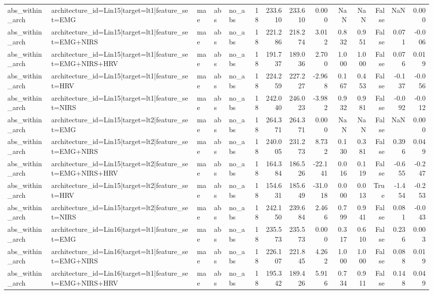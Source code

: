 \begin{table}
\begin{tabular}{lllllrrrrrrrrr}
abs_within_arch & architecture_id=Lin15|target=lt1|feature_set=EMG & mae & abs & no_abs & 18 & 233.610 & 233.610 & 0.000 & NaN & NaN & False & NaN & 0.000 \\
abs_within_arch & architecture_id=Lin15|target=lt1|feature_set=EMG+NIRS & mae & abs & no_abs & 18 & 221.286 & 218.274 & 3.012 & 0.832 & 0.951 & False & 0.071 & -0.006 \\
abs_within_arch & architecture_id=Lin15|target=lt1|feature_set=EMG+NIRS+HRV & mae & abs & no_abs & 18 & 191.737 & 189.036 & 2.700 & 1.000 & 1.000 & False & 0.076 & 0.019 \\
abs_within_arch & architecture_id=Lin15|target=lt1|feature_set=HRV & mae & abs & no_abs & 18 & 224.259 & 227.227 & -2.968 & 0.167 & 0.453 & False & -0.137 & -0.056 \\
abs_within_arch & architecture_id=Lin15|target=lt1|feature_set=NIRS & mae & abs & no_abs & 18 & 242.040 & 246.023 & -3.982 & 0.932 & 0.981 & False & -0.092 & -0.012 \\
abs_within_arch & architecture_id=Lin15|target=lt2|feature_set=EMG & mae & abs & no_abs & 18 & 264.371 & 264.371 & 0.000 & NaN & NaN & False & NaN & 0.000 \\
abs_within_arch & architecture_id=Lin15|target=lt2|feature_set=EMG+NIRS & mae & abs & no_abs & 18 & 240.005 & 231.273 & 8.732 & 0.130 & 0.381 & False & 0.396 & 0.049 \\
abs_within_arch & architecture_id=Lin15|target=lt2|feature_set=EMG+NIRS+HRV & mae & abs & no_abs & 18 & 164.384 & 186.526 & -22.141 & 0.016 & 0.119 & False & -0.655 & -0.247 \\
abs_within_arch & architecture_id=Lin15|target=lt2|feature_set=HRV & mae & abs & no_abs & 18 & 154.631 & 185.649 & -31.018 & 0.000 & 0.013 & True & -1.454 & -0.253 \\
abs_within_arch & architecture_id=Lin15|target=lt2|feature_set=NIRS & mae & abs & no_abs & 18 & 242.150 & 239.684 & 2.466 & 0.799 & 0.941 & False & 0.081 & -0.043 \\
abs_within_arch & architecture_id=Lin16|target=lt1|feature_set=EMG & mae & abs & no_abs & 18 & 235.573 & 235.573 & 0.000 & 0.317 & 0.610 & False & 0.236 & 0.003 \\
abs_within_arch & architecture_id=Lin16|target=lt1|feature_set=EMG+NIRS & mae & abs & no_abs & 18 & 226.107 & 221.845 & 4.262 & 1.000 & 1.000 & False & 0.088 & 0.019 \\
abs_within_arch & architecture_id=Lin16|target=lt1|feature_set=EMG+NIRS+HRV & mae & abs & no_abs & 18 & 195.342 & 189.426 & 5.916 & 0.734 & 0.911 & False & 0.148 & 0.049 \\

\end{tabular}
\end{table}
